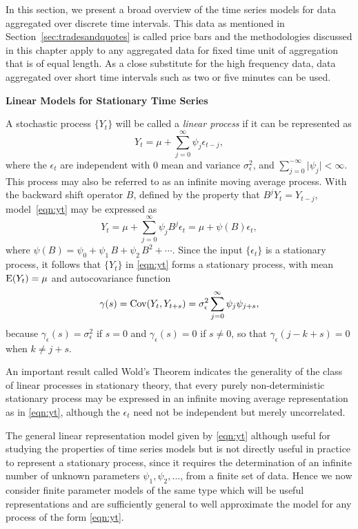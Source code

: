 In this section, we present a broad overview of the time series models for data aggregated over discrete time intervals. This data as mentioned in Section~\ref{sec:tradesandquotes} is called price bars and the methodologies discussed in this chapter apply to any aggregated data for fixed time unit of aggregation that is of equal length. As a close substitute for the high frequency data, data aggregated over short time intervals such as two or five minutes can be used. \twomedskip


\noindent\textbf{Linear Models for Stationary Time Series} \twomedskip


A stochastic process $\{ Y_t \}$ will be called a \emph{linear process} if it can be represented as
	\begin{equation} \label{eqn:yt}
          Y_t = \mu + \sum_{j=0}^{\infty}  \psi_j \epsilon_{t-j},
	\end{equation}
where the $\epsilon_t$ are independent with 0 mean and variance $\sigma^2_{\epsilon}$, and $\sum_{j=0}^{-\infty} \lvert \psi_j \rvert < \infty$. This process may also be referred to as an infinite moving average process. With the backward shift operator $B$, defined by the property that $B^j Y_t = Y_{t-j}$, model~\eqref{eqn:yt} may be expressed as
	\[
	Y_t = \mu + \sum_{j=0}^{\infty} \psi_j B^j \epsilon_t = \mu + \psi(B) \epsilon_t,
	\]
where $\psi(B) = \psi_0 + \psi_1 \, B + \psi_2 \, B^2 + \cdots$. Since the input $\{\epsilon_t\}$ is a stationary process, it follows that $\{ Y_t \}$ in \eqref{eqn:yt} forms a stationary process, with mean $\operatorname{E}(Y_t)=\mu$ and autocovariance function
	\begin{equation} \label{eqn:covyt}
	\gamma(s)= \cov(Y_t, Y_{t+s})= \sigma^2_{\epsilon} \sum_{j=0}^{\infty} \psi_j \psi_{j+s},
	\end{equation}      
because $\gamma_\epsilon(s) = \sigma^2_\epsilon$ if $s=0$ and $\gamma_\epsilon(s) = 0$ if $s \neq 0$, so that $\gamma_\epsilon(j - k + s) = 0$ when $k \neq j + s$.
	

An important result called Wold's Theorem indicates the generality of the class of linear processes in stationary theory, that every purely non-deterministic stationary process may be expressed in an infinite moving average representation as in \eqref{eqn:yt}, although the $\epsilon_t$ need not be independent but merely uncorrelated.	


The general linear representation model given by \eqref{eqn:yt} although useful for studying the properties of time series models but is not directly useful in practice to represent a stationary process, since it requires the determination of an infinite number of unknown parameters $\psi_1, \psi_2, \ldots$, from a finite set of data. Hence we now consider finite parameter models of the same type which will be useful representations and are sufficiently general to well approximate the model for any process of the form \eqref{eqn:yt}. \twomedskip


